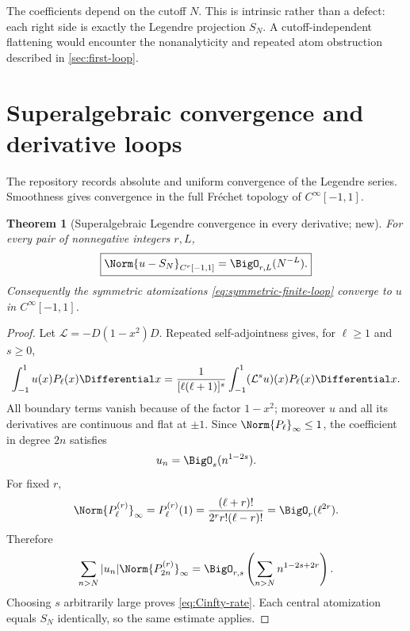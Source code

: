 \documentclass[11pt,oneside]{article}
\numberwithin{equation}{section}
\newtheorem{theorem}{Theorem}[section]
\theoremstyle{definition}
\theoremstyle{remark}
\begin{document}
The coefficients depend on the cutoff $N$.  This is intrinsic rather than a
defect: each right side is exactly the Legendre projection $S_N$.  A
cutoff-independent flattening would encounter the nonanalyticity and repeated
atom obstruction described in \cref{sec:first-loop}.

\section{Superalgebraic convergence and derivative loops}
\label{sec:Cinfty}

The repository records absolute and uniform convergence of the Legendre
series.  Smoothness gives convergence in the full Fr\'echet topology of
$C^\infty[-1,1]$.

\begin{theorem}[Superalgebraic Legendre convergence in every derivative; new]
\label{thm:Cinfty-convergence}
For every pair of nonnegative integers $r,L$,
\begin{equation}
 \boxed{
 \Norm{u-S_N}_{C^r[-1,1]}=\BigO_{r,L}(N^{-L}).}
 \label{eq:Cinfty-rate}
\end{equation}
Consequently the symmetric atomizations
\eqref{eq:symmetric-finite-loop} converge to $u$ in $C^\infty[-1,1]$.
\end{theorem}

\begin{proof}
Let $\mathcal L=-D(1-x^2)D$.  Repeated self-adjointness gives, for
$\ell\ge1$ and $s\ge0$,
\begin{equation}
 \int_{-1}^{1}u(x)P_\ell(x)\Differential x
 =\frac1{[\ell(\ell+1)]^s}
 \int_{-1}^{1}(\mathcal L^su)(x)P_\ell(x)\Differential x.
 \label{eq:coeff-integration}
\end{equation}
All boundary terms vanish because of the factor $1-x^2$; moreover $u$ and all
its derivatives are continuous and flat at $\pm1$.  Since
$\Norm{P_\ell}_\infty\le1$, the coefficient in degree $2n$ satisfies
\[
 u_n=\BigO_s(n^{1-2s}).
\]
For fixed $r$,
\begin{equation}
 \Norm{P_\ell^{(r)}}_\infty=P_\ell^{(r)}(1)
 =\frac{(\ell+r)!}{2^rr!(\ell-r)!}
 =\BigO_r(\ell^{2r}).
 \label{eq:Legendre-derivative-bound}
\end{equation}
Therefore
\[
 \sum_{n>N}|u_n|\Norm{P_{2n}^{(r)}}_\infty
 =\BigO_{r,s}\left(\sum_{n>N}n^{1-2s+2r}\right).
\]
Choosing $s$ arbitrarily large proves \eqref{eq:Cinfty-rate}.  Each central
atomization equals $S_N$ identically, so the same estimate applies.
\end{proof}
\end{document}
